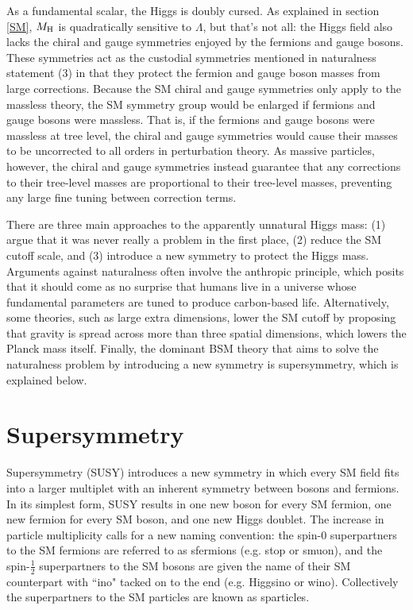 \documentclass[12pt]{article}
\begin{document}
    As a fundamental scalar, the Higgs is doubly cursed. As explained in section \ref{SM}, $M_{\mathrm{H}}$ is quadratically sensitive to $\Lambda$, but that's not all: the Higgs field also lacks the chiral and gauge symmetries enjoyed by the fermions and gauge bosons. These symmetries act as the custodial symmetries mentioned in naturalness statement (3) in that they protect the fermion and gauge boson masses from large corrections. Because the SM chiral and gauge symmetries only apply to the massless theory, the SM symmetry group would be enlarged if fermions and gauge bosons were massless. That is, if the fermions and gauge bosons were massless at tree level, the chiral and gauge symmetries would cause their masses to be uncorrected to all orders in perturbation theory. As massive particles, however, the chiral and gauge symmetries instead guarantee that any corrections to their tree-level masses are proportional to their tree-level masses, preventing any large fine tuning between correction terms.  

     There are three main approaches to the apparently unnatural Higgs mass: (1) argue that it was never really a problem in the first place, (2) reduce the SM cutoff scale, and (3) introduce a new symmetry to protect the Higgs mass. Arguments against naturalness often involve the anthropic principle, which posits that it should come as no surprise that humans live in a universe whose fundamental parameters are tuned to produce carbon-based life. Alternatively, some theories, such as large extra dimensions, lower the SM cutoff by proposing that gravity is spread across more than three spatial dimensions, which lowers the Planck mass itself. Finally, the dominant BSM theory that aims to solve the naturalness problem by introducing a new symmetry is supersymmetry, which is explained below.
    
\section{Supersymmetry}
    Supersymmetry (SUSY) introduces a new symmetry in which every SM field fits into a larger multiplet with an inherent symmetry between bosons and fermions. In its simplest form, SUSY results in one new boson for every SM fermion, one new fermion for every SM boson, and one new Higgs doublet. The increase in particle multiplicity calls for a new naming convention: the spin-0 superpartners to the SM fermions are referred to as sfermions (e.g. stop or smuon), and the spin-$\frac{1}{2}$ superpartners to the SM bosons are given the name of their SM counterpart with ``ino" tacked on to the end (e.g. Higgsino or wino). Collectively the superpartners to the SM particles are known as sparticles.  
\end{document}
